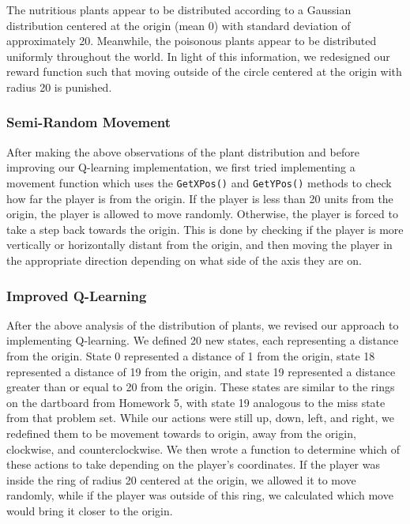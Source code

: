 \documentclass[solution, letterpaper]{cs121}
\begin{document}
The nutritious plants appear to be distributed according to a Gaussian distribution centered at the origin (mean 0) with standard deviation of approximately 20. Meanwhile, the poisonous plants appear to be distributed uniformly throughout the world. In light of this information, we redesigned our reward function such that moving outside of the circle centered at the origin with radius 20 is punished.

\subsubsection{Semi-Random Movement}
\hspace{4mm} After making the above observations of the plant distribution and before improving our Q-learning implementation, we first tried implementing a movement function which uses the {\tt GetXPos()} and {\tt GetYPos()} methods to check how far the player is from the origin. If the player is less than 20 units from the origin, the player is allowed to move randomly. Otherwise, the player is forced to take a step back towards the origin. This is done by checking if the player is more vertically or horizontally distant from the origin, and then moving the player in the appropriate direction depending on what side of the axis they are on.

\subsubsection{Improved Q-Learning}
\hspace{4mm} After the above analysis of the distribution of plants, we revised our approach to implementing Q-learning. We defined 20 new states, each representing a distance from the origin. State 0 represented a distance of 1 from the origin, state 18 represented a distance of 19 from the origin, and state 19 represented a distance greater than or equal to 20 from the origin. These states are similar to the rings on the dartboard from Homework 5, with state 19 analogous to the {\sc miss} state from that problem set. While our actions were still {\sc up}, {\sc down}, {\sc left}, and {\sc right}, we redefined them to be movement towards to origin, away from the origin, clockwise, and counterclockwise. We then wrote a function to determine which of these actions to take depending on the player's coordinates. If the player was inside the ring of radius 20 centered at the origin, we allowed it to move randomly, while if the player was outside of this ring, we calculated which move would bring it closer to the origin.
\end{document}

